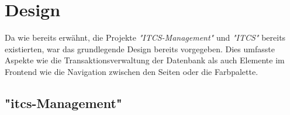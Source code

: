 \chapter{Design}\label{chap:design}
    Da wie bereits erwähnt, die Projekte \emph{"ITCS-Management"} und \emph{"ITCS"} bereits existierten, war das grundlegende Design bereits vorgegeben.
    Dies umfasste Aspekte wie die Transaktionsverwaltung der Datenbank als auch Elemente im Frontend wie die Navigation zwischen den Seiten oder die Farbpalette.
\section{"itcs-Management"} \label{sec:itcs-management-design}
    
